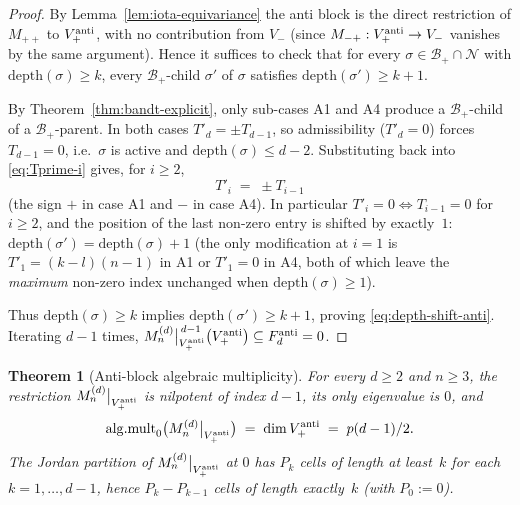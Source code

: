 \documentclass{amsart}
\newtheorem{theorem}{Theorem}[section]
\theoremstyle{definition}
\theoremstyle{remark}
\begin{document}
\begin{proof}
By Lemma~\ref{lem:iota-equivariance} the anti block is the
direct restriction of $M_{++}$ to $V_+^{\rm anti}$, with no
contribution from $V_-$ (since $M_{-+} : V_+^{\rm anti} \to V_-$
vanishes by the same argument).  Hence it suffices to check that
for every $\sigma \in \mathcal{B}_+ \cap \mathcal{N}$ with
$\mathrm{depth}(\sigma) \ge k$, every $\mathcal{B}_+$-child
$\sigma'$ of $\sigma$ satisfies $\mathrm{depth}(\sigma') \ge k+1$.

By Theorem~\ref{thm:bandt-explicit}, only sub-cases A1 and A4
produce a $\mathcal{B}_+$-child of a $\mathcal{B}_+$-parent.
In both cases $T'_d = \pm T_{d-1}$, so admissibility ($T'_d = 0$)
forces $T_{d-1} = 0$, i.e.\ $\sigma$ is active and
$\mathrm{depth}(\sigma) \le d - 2$.  Substituting back into
\eqref{eq:Tprime-i} gives, for $i \ge 2$,
\[
  T'_i \;=\; \pm T_{i-1}
\]
(the sign $+$ in case A1 and $-$ in case A4).  In particular
$T'_i = 0 \iff T_{i-1} = 0$ for $i \ge 2$, and the position of
the last non-zero entry is shifted by exactly~$1$:
$\mathrm{depth}(\sigma') = \mathrm{depth}(\sigma) + 1$
(the only modification at $i = 1$ is $T'_1 = (k - l)(n-1)$ in A1
or $T'_1 = 0$ in A4, both of which leave the \emph{maximum}
non-zero index unchanged when $\mathrm{depth}(\sigma) \ge 1$).

Thus $\mathrm{depth}(\sigma) \ge k$ implies
$\mathrm{depth}(\sigma') \ge k+1$, proving
\eqref{eq:depth-shift-anti}.  Iterating $d-1$ times,
$M_n^{(d)}\big|_{V_+^{\rm anti}}^{\,d-1}\bigl(V_+^{\rm anti}\bigr)
\subseteq F_d^{\rm anti} = 0$.
\end{proof}

\begin{theorem}[Anti-block algebraic multiplicity]
\label{thm:alg-mult-anti}
For every $d \ge 2$ and $n \ge 3$, the restriction
$M_n^{(d)}\big|_{V_+^{\rm anti}}$ is nilpotent of index $d-1$,
its only eigenvalue is $0$, and
\begin{equation}\label{eq:alg-mult-anti}
  \mathrm{alg.mult}_0\bigl(M_n^{(d)}\big|_{V_+^{\rm anti}}\bigr)
  \;=\; \dim V_+^{\rm anti} \;=\; p(d-1)/2.
\end{equation}
The Jordan partition of $M_n^{(d)}\big|_{V_+^{\rm anti}}$ at
$0$ has $P_k$ cells of length at least~$k$ for each
$k = 1, \ldots, d-1$, hence $P_k - P_{k-1}$ cells of length
exactly~$k$ (with $P_0 := 0$).
\end{theorem}
\end{document}
